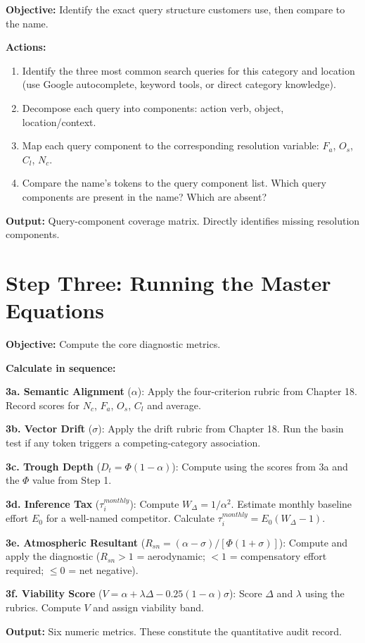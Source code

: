 \documentclass[12pt, openany]{book}
\theoremstyle{thmstyle}
\theoremstyle{defstyle}
\begin{document}
\begin{auditbox}
\textbf{Objective:} Identify the exact query structure customers use, then compare to the name.

\textbf{Actions:}
\begin{enumerate}[leftmargin=1.5em, topsep=2pt]
  \item Identify the three most common search queries for this category and location (use Google autocomplete, keyword tools, or direct category knowledge).
  \item Decompose each query into components: action verb, object, location/context.
  \item Map each query component to the corresponding resolution variable: $F_a$, $O_s$, $C_l$, $N_c$.
  \item Compare the name's tokens to the query component list. Which query components are present in the name? Which are absent?
\end{enumerate}

\textbf{Output:} Query-component coverage matrix. Directly identifies missing resolution components.
\end{auditbox}

\section{Step Three: Running the Master Equations}

\begin{auditbox}
\textbf{Objective:} Compute the core diagnostic metrics.

\textbf{Calculate in sequence:}

\textbf{3a. Semantic Alignment} ($\alpha$): Apply the four-criterion rubric from Chapter 18. Record scores for $N_c$, $F_a$, $O_s$, $C_l$ and average.

\textbf{3b. Vector Drift} ($\sigma$): Apply the drift rubric from Chapter 18. Run the basin test if any token triggers a competing-category association.

\textbf{3c. Trough Depth} ($D_t = \Phi(1-\alpha)$): Compute using the scores from 3a and the $\Phi$ value from Step 1.

\textbf{3d. Inference Tax} ($\tau_i^{monthly}$): Compute $W_\Delta = 1/\alpha^2$. Estimate monthly baseline effort $E_0$ for a well-named competitor. Calculate $\tau_i^{monthly} = E_0(W_\Delta - 1)$.

\textbf{3e. Atmospheric Resultant} ($R_{sn} = (\alpha - \sigma)/[\Phi(1+\sigma)]$): Compute and apply the diagnostic ($R_{sn} > 1$ = aerodynamic; $< 1$ = compensatory effort required; $\leq 0$ = net negative).

\textbf{3f. Viability Score} ($V = \alpha + \lambda\Delta - 0.25(1-\alpha)\sigma$): Score $\Delta$ and $\lambda$ using the rubrics. Compute $V$ and assign viability band.

\textbf{Output:} Six numeric metrics. These constitute the quantitative audit record.
\end{auditbox}
\end{document}
